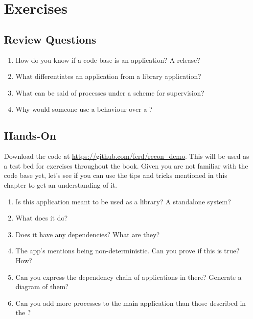\section{Exercises}

\subsection*{Review Questions}

\begin{enumerate}
	\item How do you know if a code base is an application? A release?
	\item What differentiates an application from a library application?
	\item What can be said of processes under a  scheme for supervision?
	\item Why would someone use a  behaviour over a ?
\end{enumerate}

\subsection*{Hands-On}

Download the code at \href{https://github.com/ferd/recon\_demo}{https://github.com/ferd/recon\_demo}. This will be used as a test bed for exercises throughout the book. Given you are not familiar with the code base yet, let's see if you can use the tips and tricks mentioned in this chapter to get an understanding of it.

\begin{enumerate}
	\item Is this application meant to be used as a library? A standalone system?
	\item What does it do?
	\item Does it have any dependencies? What are they?
	\item The app's  mentions being non-deterministic. Can you prove if this is true? How?
	\item Can you express the dependency chain of applications in there? Generate a diagram of them?
	\item Can you add more processes to the main application than those described in the ? 
\end{enumerate}

